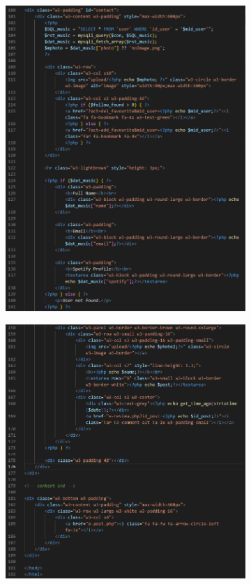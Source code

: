 \begin{enumerate}[1.]
\begin{figure}[h]
\begin{subfigure}[b]{0.6\textwidth}
            \includegraphics[width=\textwidth]{mainmatter/images/frontend/code/emprofile.png}
            \label{fig:sub1}
        \end{subfigure}
        \hspace{0.04\textwidth}
        \begin{subfigure}[b]{0.7\textwidth}
            \centering
            \includegraphics[width=\textwidth]{mainmatter/images/frontend/code/emprofile2.png}

\end{subfigure}
\end{figure}
\end{enumerate}
